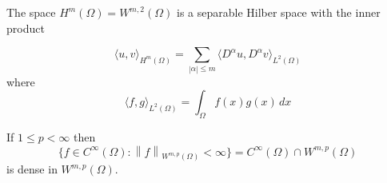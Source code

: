 \documentclass{article}
\newcommand{\norm}[1]{\left\lVert#1\right\rVert}
\newcommand{\inner}[2]{\langle #1, #2 \rangle}
\newcommand{\supp}{\text{supp}}
\begin{document}
\begin{proposition}
  The space $H^m(\Omega) = W^{m,2}(\Omega)$ is a separable Hilber space with the inner product

  \begin{equation*}
    \inner{u}{v}_{H^m(\Omega)} = \sum_{|\alpha| \leq m} \inner{D^\alpha u}{D^\alpha v}_{L^2(\Omega)}
  \end{equation*}
  where 
  \begin{equation*}
    \inner{f}{g}_{L^2(\Omega)} = \int_\Omega f(x)g(x) \, dx
  \end{equation*}
\end{proposition}

\begin{theorem}
  If $1 \leq p < \infty$ then
  \begin{equation*}
    \{f \in C^{\infty}(\Omega): \norm{f}_{W^{m,p}(\Omega)} < \infty\} = C^{\infty}(\Omega) \cap W^{m,p}(\Omega)
  \end{equation*}
  is dense in $W^{m,p}(\Omega)$.
\end{theorem}

\newpage





\end{document}
